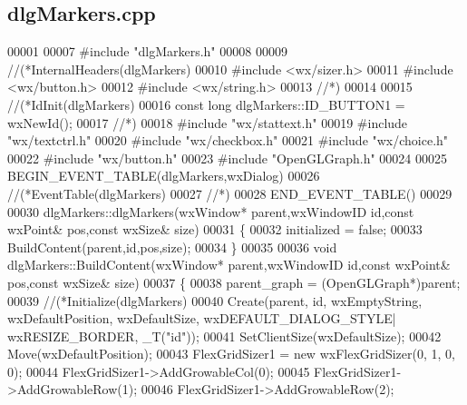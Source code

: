 \subsection{dlg\+Markers.\+cpp}
\label{dlgMarkers_8cpp_source}

\begin{DoxyCode}
00001 
00007 \textcolor{preprocessor}{#include "dlgMarkers.h"}
00008 
00009 \textcolor{comment}{//(*InternalHeaders(dlgMarkers)}
00010 \textcolor{preprocessor}{#include <wx/sizer.h>}
00011 \textcolor{preprocessor}{#include <wx/button.h>}
00012 \textcolor{preprocessor}{#include <wx/string.h>}
00013 \textcolor{comment}{//*)}
00014 
00015 \textcolor{comment}{//(*IdInit(dlgMarkers)}
00016 \textcolor{keyword}{const} \textcolor{keywordtype}{long} dlgMarkers::ID_BUTTON1 = wxNewId();
00017 \textcolor{comment}{//*)}
00018 \textcolor{preprocessor}{#include "wx/stattext.h"}
00019 \textcolor{preprocessor}{#include "wx/textctrl.h"}
00020 \textcolor{preprocessor}{#include "wx/checkbox.h"}
00021 \textcolor{preprocessor}{#include "wx/choice.h"}
00022 \textcolor{preprocessor}{#include "wx/button.h"}
00023 \textcolor{preprocessor}{#include "OpenGLGraph.h"}
00024 
00025 BEGIN\_EVENT\_TABLE(dlgMarkers,wxDialog)
00026     \textcolor{comment}{//(*EventTable(dlgMarkers)}
00027     \textcolor{comment}{//*)}
00028 END\_EVENT\_TABLE()
00029 
00030 dlgMarkers::dlgMarkers(wxWindow* parent,wxWindowID \textcolor{keywordtype}{id},const wxPoint& pos,const wxSize& 
      size)
00031 \{
00032     initialized = \textcolor{keyword}{false};
00033     BuildContent(parent,\textcolor{keywordtype}{id},pos,size);
00034 \}
00035 
00036 \textcolor{keywordtype}{void} dlgMarkers::BuildContent(wxWindow* parent,wxWindowID \textcolor{keywordtype}{id},\textcolor{keyword}{const} wxPoint& pos,\textcolor{keyword}{const} wxSize& 
      size)
00037 \{
00038     parent_graph = (OpenGLGraph*)parent;
00039     \textcolor{comment}{//(*Initialize(dlgMarkers)}
00040     Create(parent, \textcolor{keywordtype}{id}, wxEmptyString, wxDefaultPosition, wxDefaultSize, wxDEFAULT\_DIALOG\_STYLE|
      wxRESIZE\_BORDER, \_T(\textcolor{stringliteral}{"id"}));
00041     SetClientSize(wxDefaultSize);
00042     Move(wxDefaultPosition);
00043     FlexGridSizer1 = \textcolor{keyword}{new} wxFlexGridSizer(0, 1, 0, 0);
00044     FlexGridSizer1->AddGrowableCol(0);
00045     FlexGridSizer1->AddGrowableRow(1);
00046     FlexGridSizer1->AddGrowableRow(2);

\end{DoxyCode}
